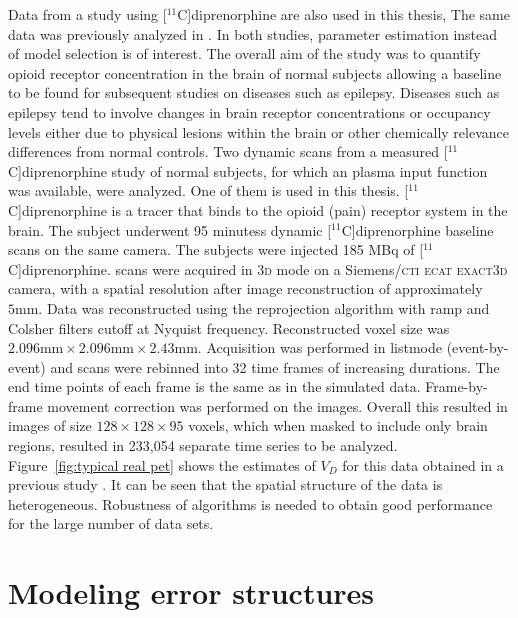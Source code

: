 Data from a \pet study using [$^{11}$C]diprenorphine are also used in this thesis, 
The same data was previously analyzed in \cite{Peng:2008fx,Jiang:2009kf}. In both studies, parameter estimation instead of model selection is of interest. The overall aim of the study was to quantify opioid receptor concentration in the brain of normal subjects allowing a baseline to be found for subsequent studies on diseases such as epilepsy. Diseases such as epilepsy tend to involve changes in brain receptor concentrations or occupancy levels either due to physical lesions within the brain or other chemically relevance differences from normal controls. Two dynamic scans from a measured [$^{11}$C]diprenorphine study of normal subjects, for which an plasma input function was available, were analyzed. One of them is used in this thesis. [$^{11}$C]diprenorphine is a tracer that binds to the opioid (pain) receptor system in the brain. The subject underwent 95 minutess dynamic [$^{11}$C]diprenorphine \pet baseline scans on the same camera. The subjects were injected 185 MBq of [$^{11}$C]diprenorphine. \pet scans were acquired in \textsc{3d} mode on a Siemens/\textsc{cti ecat exact3d} \pet camera, with a spatial resolution after image reconstruction of approximately $5\text{mm}$. Data was reconstructed using the reprojection algorithm \citep{Kinahan1989} with ramp and Colsher filters cutoff at Nyquist frequency. Reconstructed voxel size was $2.096 \text{mm} \times 2.096 \text{mm} \times2.43 \text{mm}$. Acquisition was performed in listmode (event-by-event) and scans were rebinned into 32 time frames of increasing durations. The end time points of each frame is the same as in the simulated data. Frame-by-frame movement correction was performed on the \pet images. Overall this resulted in images of size $128\times128\times95$ voxels, which when masked to include only brain regions, resulted in 233,054 separate time series to be analyzed. Figure~\ref{fig:typical real pet} shows the estimates of $V_D$ for this data obtained in a previous study \cite{Zhou2013}. It can be seen that the spatial structure of the data is heterogeneous. Robustness of algorithms is needed to obtain good performance for the large number of data sets.

\section{Modeling error structures}
\label{sec:Error models}

